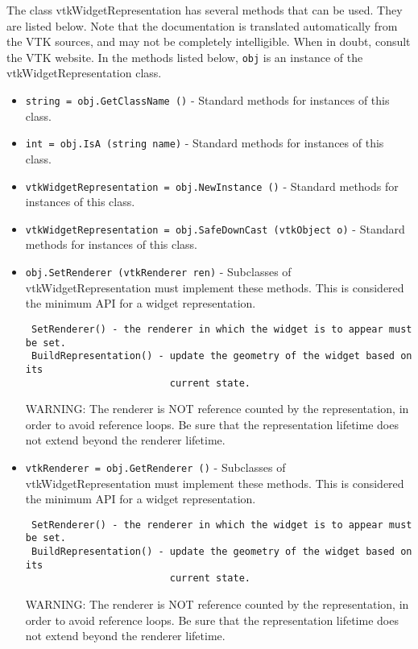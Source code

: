 The class vtkWidgetRepresentation has several methods that can be used.
  They are listed below.
Note that the documentation is translated automatically from the VTK sources,
and may not be completely intelligible.  When in doubt, consult the VTK website.
In the methods listed below, \verb|obj| is an instance of the vtkWidgetRepresentation class.
\begin{itemize}
\item  \verb|string = obj.GetClassName ()| -  Standard methods for instances of this class.

\item  \verb|int = obj.IsA (string name)| -  Standard methods for instances of this class.

\item  \verb|vtkWidgetRepresentation = obj.NewInstance ()| -  Standard methods for instances of this class.

\item  \verb|vtkWidgetRepresentation = obj.SafeDownCast (vtkObject o)| -  Standard methods for instances of this class.

\item  \verb|obj.SetRenderer (vtkRenderer ren)| -  Subclasses of vtkWidgetRepresentation must implement these methods. This is
 considered the minimum API for a widget representation.
 \begin{verbatim}
 SetRenderer() - the renderer in which the widget is to appear must be set.
 BuildRepresentation() - update the geometry of the widget based on its
                         current state.
 \end{verbatim}
 WARNING: The renderer is NOT reference counted by the representation,
 in order to avoid reference loops.  Be sure that the representation
 lifetime does not extend beyond the renderer lifetime.

\item  \verb|vtkRenderer = obj.GetRenderer ()| -  Subclasses of vtkWidgetRepresentation must implement these methods. This is
 considered the minimum API for a widget representation.
 \begin{verbatim}
 SetRenderer() - the renderer in which the widget is to appear must be set.
 BuildRepresentation() - update the geometry of the widget based on its
                         current state.
 \end{verbatim}
 WARNING: The renderer is NOT reference counted by the representation,
 in order to avoid reference loops.  Be sure that the representation
 lifetime does not extend beyond the renderer lifetime.


\end{itemize}

